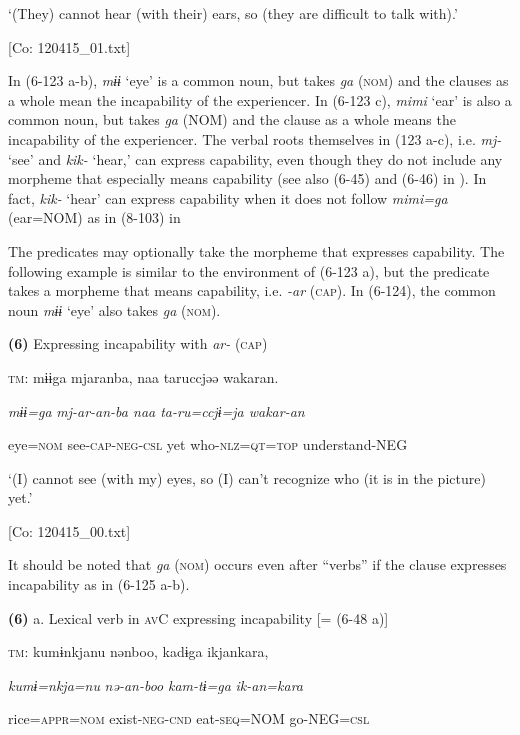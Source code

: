       ‘(They) cannot hear (with their) ears, so (they are difficult to talk with).’

      [Co: 120415\_01.txt]

In (6-123 a-b), \textit{mɨɨ} ‘eye’ is a common noun, but takes \textit{ga} (\textsc{nom}) and the clauses as a whole mean the incapability of the experiencer. In (6-123 c), \textit{mimi} ‘ear’ is also a common noun, but takes \textit{ga} (NOM) and the clause as a whole means the incapability of the experiencer. The verbal roots themselves in (123 a-c), i.e. \textit{mj-} ‘see’ and \textit{kik-} ‘hear,’ can express capability, even though they do not include any morpheme that especially means capability (see also (6-45) and (6-46) in ). In fact, \textit{kik-} ‘hear’ can express capability when it does not follow \textit{mimi=ga} (ear=NOM) as in (8-103) in 

The predicates may optionally take the morpheme that expresses capability. The following example is similar to the environment of (6-123 a), but the predicate takes a morpheme that means capability, i.e. \textit{{}-ar} (\textsc{cap}). In (6-124), the common noun \textit{mɨɨ} ‘eye’ also takes \textit{ga} (\textsc{nom}).

\textbf{(6)}  Expressing incapability with \textit{ar-} (\textsc{cap})

  \textsc{tm}:  mɨɨga  mjaranba,  naa  taruccjəə  wakaran.

    \textit{mɨɨ=ga}  \textit{mj-ar-an{}-ba  naa  ta-ru=ccjɨ=ja  wakar-an}

    eye=\textsc{nom}  see-\textsc{cap}-\textsc{neg}-\textsc{csl}  yet  who-\textsc{nlz}=\textsc{qt}=\textsc{top}  understand-NEG

    ‘(I) cannot see (with my) eyes, so (I) can’t recognize who (it is in the picture) yet.’

    [Co: 120415\_00.txt]

It should be noted that \textit{ga} (\textsc{nom}) occurs even after “verbs” if the clause expresses incapability as in (6-125 a-b).

\textbf{(6)}  a. Lexical verb in \textsc{av}C expressing incapability [= (6-48 a)]

  \textsc{tm}:  kumɨnkjanu  nənboo,  kadɨga  ikjankara,

    \textit{kumɨ=nkja=nu}  \textit{nə-an-boo}  \textit{kam-tɨ=ga}  \textit{ik-an=kara}

    rice=\textsc{appr}=\textsc{nom}  exist-\textsc{neg}-\textsc{cnd}  eat-\textsc{seq}=NOM  go-NEG=\textsc{csl}

